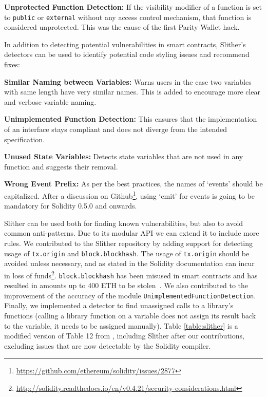 \textbf{Unprotected Function Detection:} If the visibility modifier of a function is set to \texttt{public} or \texttt{external} without any access control mechanism, that function is considered unprotected. This was the cause of the first Parity Wallet hack.

In addition to detecting potential vulnerabilities in smart contracts, Slither's detectors can be used to identify potential code styling issues and recommend fixes:

\textbf{Similar Naming between Variables:} Warns users in the case two variables with same length have very similar names. This is added to encourage more clear and verbose variable naming.

\textbf{Unimplemented Function Detection:} This ensures that the implementation of an interface stays compliant and does not diverge from the intended specification.

\textbf{Unused State Variables:} Detects state variables that are not used in any function and suggests their removal.

\textbf{Wrong Event Prefix:} As per the best practices, the names of `events' should be capitalized. After a discussion on Github\footnote{\url{https://github.com/ethereum/solidity/issues/2877}}, using `emit' for events is going to be mandatory for Solidity 0.5.0 and onwards.

Slither can be used both for finding known vulnerabilities, but also to avoid common anti-patterns. Due to its modular API we can extend it to include more rules. We contributed to the Slither repository by adding support for detecting usage of \texttt{tx.origin} and \texttt{block.blockhash}. The usage of \texttt{tx.origin} should be avoided unless necessary, and as stated in the Solidity documentation can incur in loss of funds\footnote{\url{http://solidity.readthedocs.io/en/v0.4.21/security-considerations.html}}. \texttt{block.blockhash} has been misused in smart contracts and has resulted in amounts up to 400 ETH to be stolen~\cite{smartbillions}. We also contributed to the improvement of the accuracy of the module \texttt{UnimplementedFunctionDetection}. Finally, we implemented a detector to find unassigned calls to a library's functions (calling a library function on a variable does not assign its result back to the variable, it needs to be assigned manually). Table \ref{table:slither} is a modified version of Table 12 from \cite{tools}, including Slither after our contributions, excluding issues that are now detectable by the Solidity compiler. %

